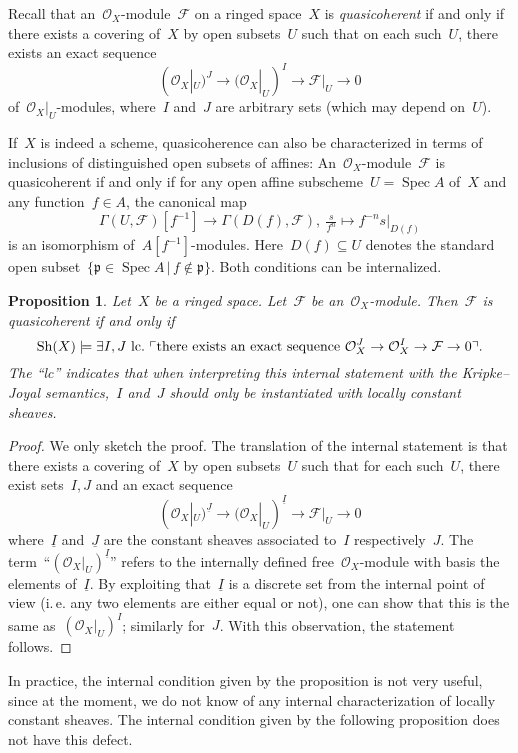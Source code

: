 \documentclass[10pt]{amsart}
\makeatletter
\theoremstyle{definition}
\theoremstyle{plain}
\newtheorem{prop}[defn]{Proposition}
\theoremstyle{remark}
\newcommand{\F}{\mathcal{F}}
\renewcommand{\O}{\mathcal{O}}
\newcommand{\ppp}{\mathfrak{p}}
\newcommand{\ul}[1]{\underline{#1}}
\newcommand{\Sh}{\mathrm{Sh}}
\DeclareMathOperator{\Spec}{Spec}
\newcommand{\?}{\,{:}\,}
\renewcommand{\_}{\mathpunct{.}\,}
\newcommand{\speak}[1]{\ulcorner\text{\textnormal{#1}}\urcorner}
\newcommand{\ie}{i.\,e.\@\xspace}
\makeatother
\begin{document}
Recall that an~$\O_X$-module~$\F$ on a ringed space~$X$ is \emph{quasicoherent}
if and only if there exists a covering of~$X$ by open subsets~$U$ such that on
each such~$U$, there exists an exact sequence
\[ (\O_X|_U)^J \longrightarrow (\O_X|_U)^I \longrightarrow \F|_U \longrightarrow 0 \]
of~$\O_X|_U$-modules, where~$I$ and~$J$ are arbitrary sets (which may depend
on~$U$).

If~$X$ is indeed a scheme, quasicoherence can also be characterized in
terms of inclusions of distinguished open subsets of affines:
An~$\O_X$-module~$\F$ is quasicoherent if and only if for any open affine
subscheme~$U = \Spec A$ of~$X$ and any function~$f \in A$, the canonical map
\[ \Gamma(U,\F)[f^{-1}] \longrightarrow \Gamma(D(f),\F),\ 
  \tfrac{s}{f^n} \longmapsto f^{-n} s|_{D(f)} \]
is an isomorphism of~$A[f^{-1}]$-modules. Here~$D(f) \subseteq U$ denotes the
standard open subset~$\{ \ppp \in \Spec A \,|\, f \not\in \ppp \}$. Both
conditions can be internalized.

\begin{prop}Let~$X$ be a ringed space. Let~$\F$ be an~$\O_X$-module. Then~$\F$
is quasicoherent if and only if
\[ \Sh(X) \models \exists I,J\ \mathrm{lc}\_ \speak{there exists an
  exact sequence~$\O_X^J \to \O_X^I \to \F \to 0$}. \]
The ``\textnormal{lc}'' indicates that when interpreting this internal statement with the
Kripke--Joyal semantics,~$I$ and~$J$ should only be instantiated with
\emph{locally constant} sheaves.
\end{prop}
\begin{proof} We only sketch the proof.
The translation of the internal statement is that there exists a covering
of~$X$ by open subsets~$U$ such that for each such~$U$, there exist sets~$I,J$
and an exact sequence
\[ (\O_X|_U)^{\ul{J}} \longrightarrow (\O_X|_U)^{\ul{I}} \longrightarrow \F|_U
\longrightarrow 0 \]
where~$\ul{I}$ and~$\ul{J}$ are the constant sheaves associated to~$I$
respectively~$J$. The term~``$(\O_X|_U)^{\ul{I}}$'' refers to the internally
defined free~$\O_X$-module with basis the elements of~$\ul{I}$. By exploiting
that~$\ul{I}$ is a discrete set from the internal point of view (\ie any two
elements are either equal or not), one can show that this is the same
as~$(\O_X|_U)^I$; similarly for~$J$. With this observation, the statement
follows.
\end{proof}

In practice, the internal condition given by the proposition is not very
useful, since at the moment, we do not know of any internal characterization of
locally constant sheaves. The internal condition given by the following
proposition does not have this defect.
\end{document}
